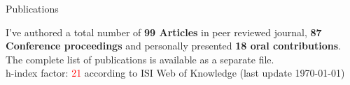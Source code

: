 \begin{cvblock}{Publications}
\end{cvblock}
I've authored a total number of \textbf{99 Articles} in peer reviewed journal,
\textbf{87 Conference proceedings} and personally presented \textbf{18 oral
contributions}. The complete list of publications is available as a
separate file. \\
h-index factor: \textcolor{red}{21} according to ISI Web of Knowledge (last update \today)

